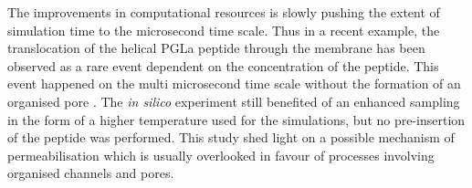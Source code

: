 The improvements in computational resources is slowly pushing the extent of simulation time to the microsecond time scale.
%
Thus in a recent example, the translocation of the helical PGLa peptide through the membrane has been observed as a rare event dependent on the concentration of the peptide. This event happened on the multi microsecond time scale without the formation of an organised pore \citep{Ulmschneider2017}. The \emph{in silico} experiment still benefited of an enhanced sampling in the form of a higher temperature used for the simulations, but no pre-insertion of the peptide was performed. This study shed light on a possible mechanism of permeabilisation which is usually overlooked in favour of processes involving organised channels and pores. 

